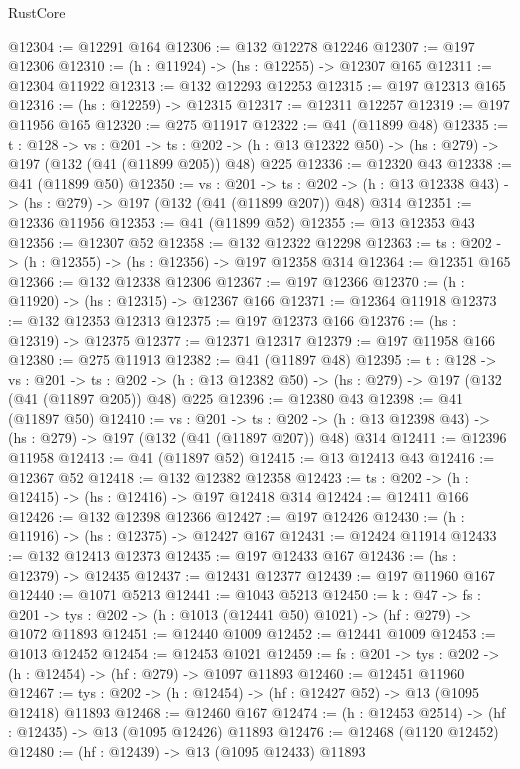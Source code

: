 \begin{lexlean}{RustCore}
\begin{coremodule}
@12304 := @12291 @164
@12306 := @132 @12278 @12246
@12307 := @197 @12306
@12310 := (h : @11924) -> (hs : @12255) -> @12307 @165
@12311 := @12304 @11922
@12313 := @132 @12293 @12253
@12315 := @197 @12313 @165
@12316 := (hs : @12259) -> @12315
@12317 := @12311 @12257
@12319 := @197 @11956 @165
@12320 := @275 @11917
@12322 := @41 (@11899 @48)
@12335 := {t : @128} ->
  {vs : @201} ->
  {ts : @202} -> (h : @13 @12322 @50) -> (hs : @279) -> @197 (@132 (@41 (@11899 @205)) @48) @225
@12336 := @12320 @43
@12338 := @41 (@11899 @50)
@12350 := {vs : @201} ->
  {ts : @202} -> (h : @13 @12338 @43) -> (hs : @279) -> @197 (@132 (@41 (@11899 @207)) @48) @314
@12351 := @12336 @11956
@12353 := @41 (@11899 @52)
@12355 := @13 @12353 @43
@12356 := @12307 @52
@12358 := @132 @12322 @12298
@12363 := {ts : @202} -> (h : @12355) -> (hs : @12356) -> @197 @12358 @314
@12364 := @12351 @165
@12366 := @132 @12338 @12306
@12367 := @197 @12366
@12370 := (h : @11920) -> (hs : @12315) -> @12367 @166
@12371 := @12364 @11918
@12373 := @132 @12353 @12313
@12375 := @197 @12373 @166
@12376 := (hs : @12319) -> @12375
@12377 := @12371 @12317
@12379 := @197 @11958 @166
@12380 := @275 @11913
@12382 := @41 (@11897 @48)
@12395 := {t : @128} ->
  {vs : @201} ->
  {ts : @202} -> (h : @13 @12382 @50) -> (hs : @279) -> @197 (@132 (@41 (@11897 @205)) @48) @225
@12396 := @12380 @43
@12398 := @41 (@11897 @50)
@12410 := {vs : @201} ->
  {ts : @202} -> (h : @13 @12398 @43) -> (hs : @279) -> @197 (@132 (@41 (@11897 @207)) @48) @314
@12411 := @12396 @11958
@12413 := @41 (@11897 @52)
@12415 := @13 @12413 @43
@12416 := @12367 @52
@12418 := @132 @12382 @12358
@12423 := {ts : @202} -> (h : @12415) -> (hs : @12416) -> @197 @12418 @314
@12424 := @12411 @166
@12426 := @132 @12398 @12366
@12427 := @197 @12426
@12430 := (h : @11916) -> (hs : @12375) -> @12427 @167
@12431 := @12424 @11914
@12433 := @132 @12413 @12373
@12435 := @197 @12433 @167
@12436 := (hs : @12379) -> @12435
@12437 := @12431 @12377
@12439 := @197 @11960 @167
@12440 := @1071 @5213
@12441 := @1043 @5213
@12450 := {k : @47} ->
  {fs : @201} -> {tys : @202} -> (h : @1013 (@12441 @50) @1021) -> (hf : @279) -> @1072 @11893
@12451 := @12440 @1009
@12452 := @12441 @1009
@12453 := @1013 @12452
@12454 := @12453 @1021
@12459 := {fs : @201} -> {tys : @202} -> (h : @12454) -> (hf : @279) -> @1097 @11893
@12460 := @12451 @11960
@12467 := {tys : @202} -> (h : @12454) -> (hf : @12427 @52) -> @13 (@1095 @12418) @11893
@12468 := @12460 @167
@12474 := (h : @12453 @2514) -> (hf : @12435) -> @13 (@1095 @12426) @11893
@12476 := @12468 (@1120 @12452)
@12480 := (hf : @12439) -> @13 (@1095 @12433) @11893

\end{coremodule}
\end{lexlean}
